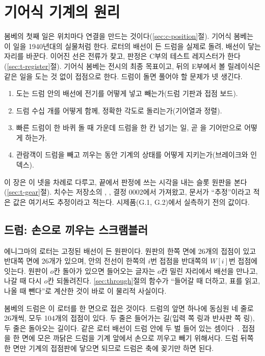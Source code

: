 \chapter{기어식 기계의 원리}\label{ch:50-gear-mechanics}

봄베의 첫째 일은 위치마다 연결을 만드는 것이다(\ref{sec:c-position}절). 기어식 봄베는 이 일을 1940년대의
실물처럼 한다. 로터의 배선이 든 드럼을 실제로 돌려, 배선이 닿는 자리를 바꾼다. 이어진 선은 전류가 찾고, 판정은
C부의 테스트 레지스터가 한다(\ref{sec:t-register}절). 기어식 봄베는 전시의 최종 목표이고, 뒤의 E부에서 볼 릴레이식은 같은 일을 도는 것
없이 접점으로 한다. 드럼이 돌면 풀어야 할 문제가 넷 생긴다.

\begin{enumerate}
\item 도는 드럼 안의 배선에 전기를 어떻게 넣고 빼는가(드럼 기판과 접점 보드).
\item 드럼 수십 개를 어떻게 함께, 정확한 각도로 돌리는가(기어열과 정렬).
\item 빠른 드럼이 한 바퀴 돌 때 가운데 드럼을 한 칸 넘기는 일, 곧 을 기어만으로 어떻게 하는가.
\item 관람객이 드럼을 빼고 끼우는 동안 기계의 상태를 어떻게 지키는가(브레이크와 인덱스).
\end{enumerate}

이 장은 이 넷을 차례로 다루고, 끝에서 판정에 쓰는 시각을 내는 슬롯 원판을 본다(\ref{sec:t-gear}절). 치수는 저장소의 , , 결정 0002에서 가져왔고, 문서가
``추정''이라고 적은 값은 여기서도 추정이라고 적는다. 시제품(G.1, G.2)에서 실측하기 전의 값이다.

\section{드럼: 손으로 끼우는 스크램블러}\label{sec:gm-drum}

\Why 에니그마의 로터는 고정된 배선이 든 원판이다. 원판의 한쪽 면에 26개의 접점이 있고 반대쪽 면에 26개가 있으며,
안의 전선이 한쪽의 $i$번 접점을 반대쪽의 $W[i]$번 접점에 잇는다. 원판이 $o$칸 돌아가 있으면 들어오는 글자는
$o$칸 밀린 자리에서 배선을 만나고, 나갈 때 다시 $o$칸 되돌려진다. \ref{sec:through}절의  함수가
``들어갈 때 더하고, 표를 읽고, 나올 때 뺀다''로 계산한 것이 바로 이 물리적 사실이다.

봄베의 드럼은 이 로터를 한 면으로 접은 것이다. 드럼의 앞면 하나에 동심원 네 줄로 26개씩, 모두 104개의 접점이
있다. 두 줄은 들어가는 길(입력 쪽 링과 반사판 쪽 링), 두 줄은 돌아오는 길이다. 같은 로터 배선이 드럼 안에 두
벌 들어 있는 셈이다~\cite{ellsbury1998bombe}. 접점을 한 면에 모은 까닭은 드럼을 기계 앞에서 손으로 끼우고 빼기
위해서다. 드럼 뒤쪽 한 면만 기계의 접점판에 닿으면 되므로 드럼은 축에 꽂기만 하면 된다.

